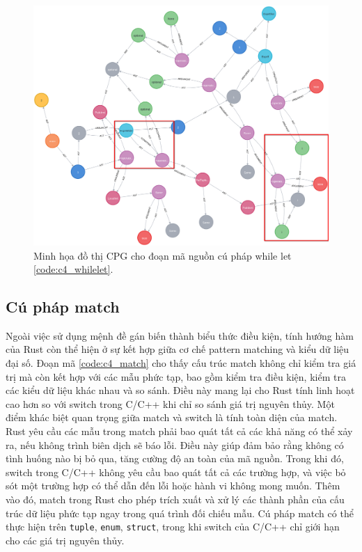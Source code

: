 \begin{figure}[H]
    \includegraphics[width=1\columnwidth]{figures/c4.highlight/c4_whilelet.png}
    \centering
    \caption{Minh họa đồ thị CPG cho đoạn mã nguồn cú pháp while let \ref{code:c4_whilelet}.}
    \label{img:c4_cpg_whilelet}
\end{figure}

\subsection{Cú pháp match}

Ngoài việc sử dụng mệnh đề gán biến thành biểu thức điều kiện, tính hướng hàm của Rust còn thể hiện ở sự kết hợp giữa cơ chế pattern matching và kiểu dữ liệu đại số.
Đoạn mã \ref{code:c4_match} cho thấy cấu trúc match không chỉ kiểm tra giá trị mà còn kết hợp với các mẫu phức tạp, bao gồm kiểm tra điều kiện, kiểm tra các kiểu dữ liệu khác nhau và so sánh.
Điều này mang lại cho Rust tính linh hoạt cao hơn so với switch trong C/C++ khi chỉ so sánh giá trị nguyên thủy.
Một điểm khác biệt quan trọng giữa match và switch là tính toàn diện của match.
Rust yêu cầu các mẫu trong match phải bao quát tất cả các khả năng có thể xảy ra, nếu không trình biên dịch sẽ báo lỗi.
Điều này giúp đảm bảo rằng không có tình huống nào bị bỏ qua, tăng cường độ an toàn của mã nguồn.
Trong khi đó, switch trong C/C++ không yêu cầu bao quát tất cả các trường hợp, và việc bỏ sót một trường hợp có thể dẫn đến lỗi hoặc hành vi không mong muốn.
Thêm vào đó, match trong Rust cho phép trích xuất và xử lý các thành phần của cấu trúc dữ liệu phức tạp ngay trong quá trình đối chiếu mẫu.
Cú pháp match có thể thực hiện trên \texttt{tuple}, \texttt{enum}, \texttt{struct}, trong khi switch của C/C++ chỉ giới hạn cho các giá trị nguyên thủy.

